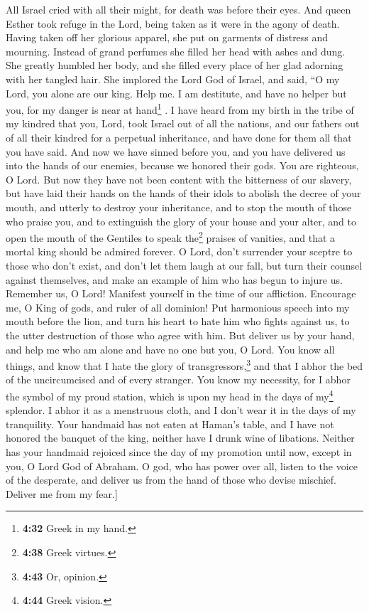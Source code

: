  All Israel cried with all their might, for death was
before their eyes.  And queen Esther took refuge in the
Lord, being taken as it were in the agony of death. 
Having taken off her glorious apparel, she put on garments of distress
and mourning. Instead of grand perfumes she filled her head with ashes
and dung. She greatly humbled her body, and she filled every place of
her glad adorning with her tangled hair.  She implored
the Lord God of Israel, and said, ``O my Lord, you alone are our king.
Help me. I am destitute, and have no helper but you,  for
my danger is near at hand\footnote{\textbf{4:32} Greek in my hand.} .
 I have heard from my birth in the tribe of my kindred
that you, Lord, took Israel out of all the nations, and our fathers out
of all their kindred for a perpetual inheritance, and have done for them
all that you have said.  And now we have sinned before
you, and you have delivered us into the hands of our enemies,
 because we honored their gods. You are righteous, O
Lord.  But now they have not been content with the
bitterness of our slavery, but have laid their hands on the hands of
their idols  to abolish the decree of your mouth, and
utterly to destroy your inheritance, and to stop the mouth of those who
praise you, and to extinguish the glory of your house and your alter,
 and to open the mouth of the Gentiles to speak
the\footnote{\textbf{4:38} Greek virtues.} praises of vanities, and that
a mortal king should be admired forever.  O Lord, don't
surrender your sceptre to those who don't exist, and don't let them
laugh at our fall, but turn their counsel against themselves, and make
an example of him who has begun to injure us.  Remember
us, O Lord! Manifest yourself in the time of our affliction. Encourage
me, O King of gods, and ruler of all dominion!  Put
harmonious speech into my mouth before the lion, and turn his heart to
hate him who fights against us, to the utter destruction of those who
agree with him.  But deliver us by your hand, and help me
who am alone and have no one but you, O Lord.  You know
all things, and know that I hate the glory of transgressors,\footnote{\textbf{4:43}
  Or, opinion.} and that I abhor the bed of the uncircumcised and of
every stranger.  You know my necessity, for I abhor the
symbol of my proud station, which is upon my head in the days of
my\footnote{\textbf{4:44} Greek vision.} splendor. I abhor it as a
menstruous cloth, and I don't wear it in the days of my tranquility.
 Your handmaid has not eaten at Haman's table, and I have
not honored the banquet of the king, neither have I drunk wine of
libations.  Neither has your handmaid rejoiced since the
day of my promotion until now, except in you, O Lord God of Abraham.
 O god, who has power over all, listen to the voice of
the desperate, and deliver us from the hand of those who devise
mischief. Deliver me from my fear.{]}

